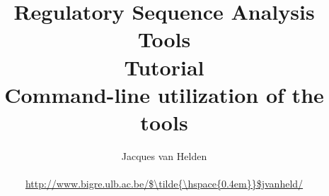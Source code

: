 \documentclass{book}
\begin{document}
\title{Regulatory Sequence Analysis Tools \\
Tutorial \\
Command-line utilization of the tools}

\author{
	Jacques van Helden \\
	 \\
	\url{http://www.bigre.ulb.ac.be/$\tilde{\hspace{0.4em}}$jvanheld/} \\
	\bigre 
}

\maketitle

\newpage
\tableofcontents
\newpage

\newpage


\newpage


\newpage


\newpage


\newpage


\newpage


\newpage


\newpage


\newpage


\newpage


\newpage


\newpage


\newpage


\newpage


\newpage


\newpage




\newpage


\newpage


\newpage


\newpage


\newpage

\end{document}
